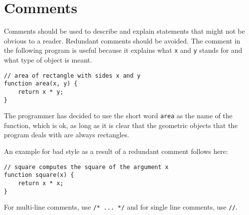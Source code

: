 \section*{Comments}
Comments should be used to describe and explain statements 
that might not be obvious to a reader.
Redundant comments should be avoided. The comment in the following program is useful
because it explains what \lstinline{x} and \lstinline{y} stands for and what type of
object is meant. 
\begin{lstlisting}
// area of rectangle with sides x and y
function area(x, y) {
    return x * y;
}
\end{lstlisting}
The programmer has decided to use the short word \lstinline{area} as the name of the function,
which is ok, as long as it is clear that the geometric objects that the program deals with
are always rectangles.

An example for bad style as a result of a redundant comment follows here:
\begin{lstlisting}
// square computes the square of the argument x
function square(x) {
    return x * x;
}
\end{lstlisting}
%
For multi-line comments, use \lstinline{/* ... */} and for single line comments, use \lstinline{//}.



      

